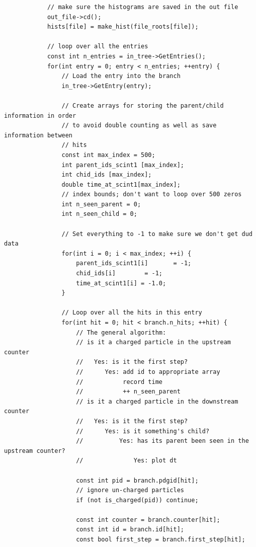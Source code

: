 \documentclass[]{article}
\begin{document}
\begin{verbatim}
            // make sure the histograms are saved in the out file
            out_file->cd();
            hists[file] = make_hist(file_roots[file]);
            
            // loop over all the entries
            const int n_entries = in_tree->GetEntries();
            for(int entry = 0; entry < n_entries; ++entry) {
                // Load the entry into the branch
                in_tree->GetEntry(entry);
                
                // Create arrays for storing the parent/child information in order
                // to avoid double counting as well as save information between
                // hits
                const int max_index = 500;
                int parent_ids_scint1 [max_index];
                int chid_ids [max_index];
                double time_at_scint1[max_index]; 
                // index bounds; don't want to loop over 500 zeros
                int n_seen_parent = 0;  
                int n_seen_child = 0;

                // Set everything to -1 to make sure we don't get dud data
                for(int i = 0; i < max_index; ++i) {
                    parent_ids_scint1[i]       = -1;
                    chid_ids[i]        = -1;
                    time_at_scint1[i] = -1.0;
                }
                
                // Loop over all the hits in this entry
                for(int hit = 0; hit < branch.n_hits; ++hit) {
                    // The general algorithm:
                    // is it a charged particle in the upstream counter
                    //   Yes: is it the first step?
                    //      Yes: add id to appropriate array
                    //           record time
                    //           ++ n_seen_parent
                    // is it a charged particle in the downstream counter
                    //   Yes: is it the first step?
                    //      Yes: is it something's child?
                    //          Yes: has its parent been seen in the upstream counter?
                    //              Yes: plot dt
                    
                    const int pid = branch.pdgid[hit];
                    // ignore un-charged particles
                    if (not is_charged(pid)) continue;

                    const int counter = branch.counter[hit];
                    const int id = branch.id[hit];
                    const bool first_step = branch.first_step[hit];
                    

\end{verbatim}
\end{document}
